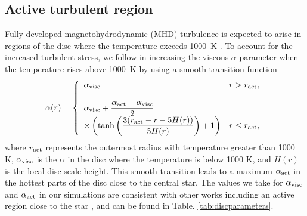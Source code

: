 \documentclass[a4paper,fleqn,usenatbib]{mnras}
\begin{document}
\subsection{Active turbulent region}
Fully developed magnetohydrodynamic (MHD) turbulence is expected to arise in regions of the disc where the temperature exceeds 1000~K \citep{UmebayashiNakano1988, DeschTurner2015}. 
To account for the increased turbulent stress, we follow \citet{ColemanNelson16} in increasing the viscous $\alpha$ parameter when the temperature rises above 1000~K by using a smooth transition function
\begin{equation}
\alpha(r) = \left\{ \begin{array}{ll}
\alpha_{\rm visc} & r > r_{\rm act}, \\
\\
\alpha_{\rm visc} + \dfrac{\alpha_{\rm act}-\alpha_{\rm visc}}{2} \\
\times\left(\tanh\left(\dfrac{3(r_{\rm act}-r-5H(r))}{5H(r)}\right)+1\right) & r \le r_{\rm act}, \\
\end{array} \right.
\end{equation}
where $r_{\rm act}$ represents the outermost radius with temperature greater than 1000 K, $\alpha_{\rm visc}$ is the $\alpha$ in the disc where the temperature is below 1000 K, and $H(r)$ is the local disc scale height.
This smooth transition leads to a maximum $\alpha_{\rm act}$ in the hottest parts of the disc close to the central star.
The values we take for $\alpha_{\rm visc}$ and $\alpha_{\rm act}$ in our simulations are consistent with other works including an active region close to the star \citep{Flock19}, and can be found in Table. \ref{tab:discparameters}.
\end{document}
